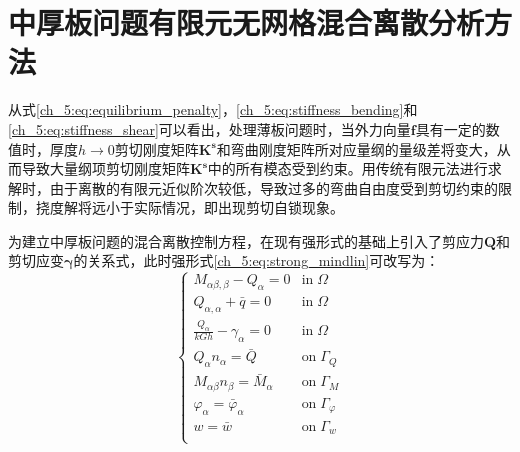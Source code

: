 \section{中厚板问题有限元无网格混合离散分析方法} 
从式\eqref{ch_5:eq:equilibrium_penalty}，\eqref{ch_5:eq:stiffness_bending}和\eqref{ch_5:eq:stiffness_shear}可以看出，处理薄板问题时，当外力向量$\boldsymbol{f}$具有一定的数值时，厚度$h\rightarrow 0$剪切刚度矩阵$\boldsymbol{K^s}$和弯曲刚度矩阵所对应量纲的量级差将变大，从而导致大量纲项剪切刚度矩阵$\boldsymbol{K^s}$中的所有模态受到约束。用传统有限元法进行求解时，由于离散的有限元近似阶次较低，导致过多的弯曲自由度受到剪切约束的限制，挠度解将远小于实际情况，即出现剪切自锁现象。  

为建立中厚板问题的混合离散控制方程，在现有强形式的基础上引入了剪应力$\boldsymbol Q$和剪切应变$\boldsymbol \gamma$的关系式，此时强形式\eqref{ch_5:eq:strong_mindlin}可改写为：
\begin{equation}\label{ch_5:eq:strong_mindlin_mix}
    \begin{cases}
        M_{\alpha\beta,\beta} - Q_\alpha = 0 & \textrm{in}\; \Omega \\
        Q_{\alpha,\alpha} + \bar q = 0 & \textrm{in}\; \Omega \\
        \frac{Q_\alpha}{kGh} -\gamma_\alpha = 0 & \textrm{in}\; \Omega \\
        Q_\alpha n_\alpha = \bar Q & \textrm{on}\; \Gamma_Q \\
        M_{\alpha\beta} n_\beta = \bar M_\alpha & \textrm{on}\; \Gamma_M \\
        \varphi_\alpha = \bar \varphi_\alpha & \textrm{on}\; \Gamma_\varphi \\
        w = \bar w & \textrm{on}\; \Gamma_w \\
    \end{cases}
\end{equation}

